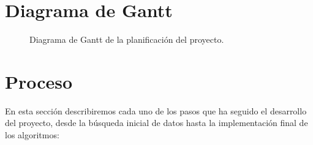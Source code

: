\section{Diagrama de Gantt}

    \begin{figure}[H]
        \centering
        
        \caption{Diagrama de Gantt de la planificación del proyecto.}
        \label{GranttImage}
    \end{figure}

\section{Proceso}

    En esta sección describiremos cada uno de los pasos que ha seguido el desarrollo del proyecto, desde la búsqueda inicial de datos hasta la implementación final de los algoritmos:

